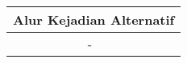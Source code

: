 \begin{table}[H]
\begin{tabular}{|r|p{8cm}|}
		\multicolumn{2}{|c|}{\textbf{Alur Kejadian Alternatif}}                                                         \\ \hline
		\multicolumn{1}{|l|}{}                                           & 	
			-
			\\ \hline
	\end{tabular}
\end{table}